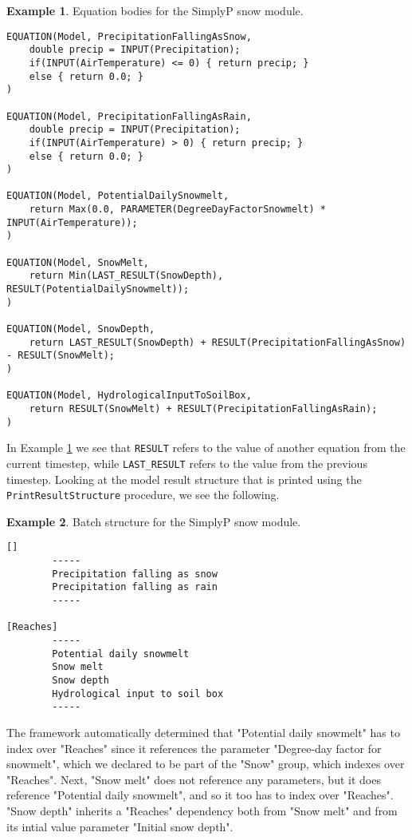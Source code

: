 \documentclass[11pt]{article}
\theoremstyle{definition}
\newtheorem{myexample}{Example}
\newenvironment{example}%
  {\begin{lrbox}{\examplebox}%
   \begin{minipage}{\dimexpr\linewidth-2\fboxsep}
   \begin{myexample}}%
  {\end{myexample}%
   \end{minipage}%
   \end{lrbox}%
   \begin{trivlist}
     \item[]\colorbox{silver}{\usebox\examplebox}
   \end{trivlist}}
\begin{document}
\begin{example}\label{ex:simplypequations}
Equation bodies for the SimplyP snow module.
\begin{lstlisting}[style=mycpp]
EQUATION(Model, PrecipitationFallingAsSnow,
	double precip = INPUT(Precipitation);
	if(INPUT(AirTemperature) <= 0) { return precip; }
	else { return 0.0; }
)

EQUATION(Model, PrecipitationFallingAsRain,
	double precip = INPUT(Precipitation);
	if(INPUT(AirTemperature) > 0) { return precip; }
	else { return 0.0; }
)

EQUATION(Model, PotentialDailySnowmelt,
	return Max(0.0, PARAMETER(DegreeDayFactorSnowmelt) * INPUT(AirTemperature));
)

EQUATION(Model, SnowMelt,
	return Min(LAST_RESULT(SnowDepth), RESULT(PotentialDailySnowmelt));
)

EQUATION(Model, SnowDepth,
	return LAST_RESULT(SnowDepth) + RESULT(PrecipitationFallingAsSnow) - RESULT(SnowMelt);
)

EQUATION(Model, HydrologicalInputToSoilBox,
	return RESULT(SnowMelt) + RESULT(PrecipitationFallingAsRain);
)
\end{lstlisting}
\end{example}

In Example \ref{ex:simplypequations} we see that {\tt RESULT} refers to the value of another equation from the current timestep, while {\tt LAST\_RESULT} refers to the value from the previous timestep. Looking at the model result structure that is printed using the {\tt PrintResultStructure} procedure, we see the following.

\begin{example}
Batch structure for the SimplyP snow module.
\begin{lstlisting}[style=textstyle]
[]
        -----
        Precipitation falling as snow
        Precipitation falling as rain
        -----

[Reaches]
        -----
        Potential daily snowmelt
        Snow melt
        Snow depth
        Hydrological input to soil box
        -----
\end{lstlisting}
\end{example}

The framework automatically determined that "Potential daily snowmelt" has to index over "Reaches" since it references the parameter "Degree-day factor for snowmelt", which we declared to be part of the "Snow" group, which indexes over "Reaches". Next, "Snow melt" does not reference any parameters, but it does reference "Potential daily snowmelt", and so it too has to index over "Reaches". "Snow depth" inherits a "Reaches" dependency both from "Snow melt" and from its intial value parameter "Initial snow depth".
\end{document}
